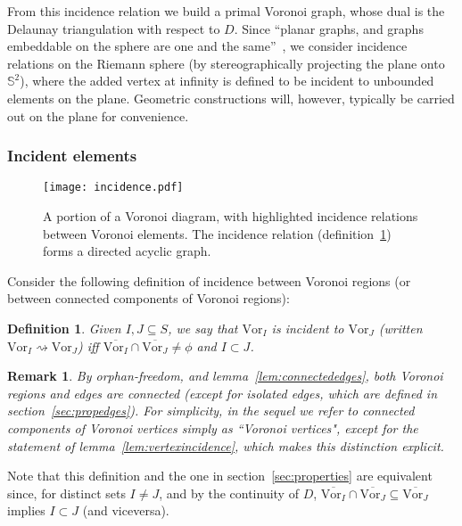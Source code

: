 \documentclass[11pt]{article}
\newtheorem{definition}{Definition}
\newtheorem{remark}{Remark}
\newcommand{\Vor}{\text{Vor}}
\begin{document}
From this incidence relation we build a primal Voronoi graph, whose dual is the Delaunay triangulation with respect to $D$. 
Since ``planar graphs, and graphs embeddable on the sphere are one and the same''~\cite[p.\ 247]{bondy2008graph}, 
	we consider incidence relations on the Riemann sphere (by stereographically projecting the plane onto $\mathbb{S}^2$), 
	where the added vertex at infinity is defined to be incident to unbounded elements on the plane. 
Geometric constructions will, however, typically be carried out on the plane for convenience. 







\subsubsection{Incident elements}\label{sec:incidence}


\begin{figure}[htbp]
   \centering
\texttt{[image: incidence.pdf]}
\caption{A portion of a Voronoi diagram, with highlighted incidence relations between Voronoi elements. 
   		The incidence relation (definition~\ref{def:incidence}) forms a directed acyclic graph. }
   \label{fig:incidence}
\end{figure}

Consider the following definition of incidence between Voronoi regions (or between connected components of Voronoi regions):

\begin{definition}\label{def:incidence}
Given $I,J\subseteq S$, we say that $\Vor_I$ is incident to $\Vor_J$ (written $\Vor_I \rightsquigarrow \Vor_J$) iff 
$\overline{\Vor_I}\cap\overline{\Vor_J}\ne\phi$ 
	\emph{and} $I\subset J$. 
\end{definition}



\begin{remark}
By orphan-freedom, and lemma~\ref{lem:connectededges}, both Voronoi regions and edges are connected
	(except for isolated edges, which are defined in section~\ref{sec:propedges}).
For simplicity, in the sequel we refer to connected components of Voronoi vertices simply as ``Voronoi vertices",
	except for the statement of lemma~\ref{lem:vertexincidence}, which makes this distinction explicit. 
\end{remark}


Note that this definition and the one in section~\ref{sec:properties} are equivalent since, 
	for distinct sets $I\ne J$, and 	by the continuity of $D$, 
	$\overline{\Vor_I}\cap\overline{\Vor_J}\subseteq\overline{\Vor_J}$ implies $I\subset J$
	(and viceversa). 
\end{document}
